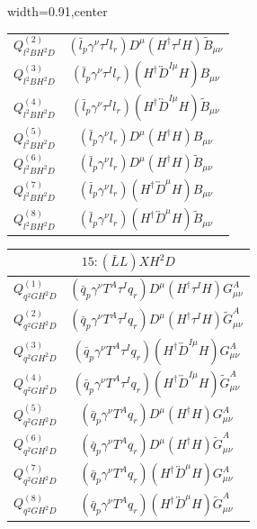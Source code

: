 \begin{table}[H]
\begin{center}
\begin{adjustbox}{width=0.91\textwidth,center}
\begin{minipage}[t]{6.3cm}
\begin{tabular}[t]{c|c}
%
$Q_{l^2BH^2D}^{(2)}$  &  $(\bar{l}_p \gamma^\nu \tau^I l_r) D^{\mu} (H^\dag \tau^I H) \widetilde B_{\mu\nu}$ \\
%
$Q_{l^2BH^2D}^{(3)}$  &  $(\bar{l}_p \gamma^\nu \tau^I l_r) (H^\dag \overleftrightarrow{D}^{I\mu} H) B_{\mu\nu}$ \\
%
$Q_{l^2BH^2D}^{(4)}$  &  $(\bar{l}_p \gamma^\nu \tau^I l_r) (H^\dag \overleftrightarrow{D}^{I\mu} H) \widetilde B_{\mu\nu}$ \\
%
$Q_{l^2BH^2D}^{(5)}$  &  $(\bar{l}_p \gamma^\nu l_r) D^{\mu} (H^\dag H) B_{\mu\nu}$ \\
%
$Q_{l^2BH^2D}^{(6)}$  &  $(\bar{l}_p \gamma^\nu l_r) D^{\mu} (H^\dag H) \widetilde B_{\mu\nu}$ \\
%
$Q_{l^2BH^2D}^{(7)}$  &  $(\bar{l}_p \gamma^\nu l_r) (H^\dag \overleftrightarrow{D}^\mu H) B_{\mu\nu}$ \\
%
$Q_{l^2BH^2D}^{(8)}$  &  $(\bar{l}_p \gamma^\nu l_r) (H^\dag \overleftrightarrow{D}^\mu H) \widetilde B_{\mu\nu}$ \\
%
\end{tabular}
\end{minipage}
\hspace{1cm}
\begin{minipage}[t]{6.3cm}
\renewcommand{\arraystretch}{1.5}
\begin{tabular}[t]{c|c}
\multicolumn{2}{c}{\boldmath$15:(\bar L L)XH^2D$} \\
\hline
$Q_{q^2GH^2D}^{(1)}$  &  $(\bar{q}_p \gamma^\nu T^A \tau^I q_r) D^{\mu} (H^\dag \tau^I H) G_{\mu\nu}^A$ \\
%
$Q_{q^2GH^2D}^{(2)}$  &  $(\bar{q}_p \gamma^\nu T^A \tau^I q_r) D^{\mu} (H^\dag \tau^I H) \widetilde G_{\mu\nu}^A$ \\
%
$Q_{q^2GH^2D}^{(3)}$  &  $(\bar{q}_p \gamma^\nu T^A \tau^I q_r) (H^\dag \overleftrightarrow{D}^{I\mu} H) G_{\mu\nu}^A$ \\
%
$Q_{q^2GH^2D}^{(4)}$  &  $(\bar{q}_p \gamma^\nu T^A \tau^I q_r) (H^\dag \overleftrightarrow{D}^{I\mu} H) \widetilde G_{\mu\nu}^A$ \\
%
$Q_{q^2GH^2D}^{(5)}$  &  $(\bar{q}_p \gamma^\nu T^A q_r) D^{\mu} (H^\dag H) G_{\mu\nu}^A$ \\
%
$Q_{q^2GH^2D}^{(6)}$  &  $(\bar{q}_p \gamma^\nu T^A q_r) D^{\mu} (H^\dag H) \widetilde G_{\mu\nu}^A$ \\
%
$Q_{q^2GH^2D}^{(7)}$  &  $(\bar{q}_p \gamma^\nu T^A q_r) (H^\dag \overleftrightarrow{D}^\mu H) G_{\mu\nu}^A$ \\
%
$Q_{q^2GH^2D}^{(8)}$  &  $(\bar{q}_p \gamma^\nu T^A q_r) (H^\dag \overleftrightarrow{D}^\mu H) \widetilde G_{\mu\nu}^A$ \\

\end{tabular}
\end{minipage}
\end{adjustbox}
\end{center}
\end{table}
